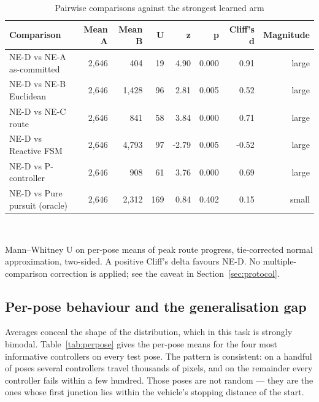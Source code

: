 \documentclass[conference]{IEEEtran}
\begin{document}
\begin{table}[!t]
\caption{Pairwise comparisons against the strongest learned arm}
\label{tab:tests}
\centering
\footnotesize
\begin{tabular}{lrrrrrrr}
\toprule
Comparison & Mean A & Mean B & U & z & p & Cliff's d & Magnitude \\
\midrule
NE-D vs NE-A as-committed & 2,646 & 404 & 19 & 4.90 & 0.000 & 0.91 & large \\
NE-D vs NE-B Euclidean & 2,646 & 1,428 & 96 & 2.81 & 0.005 & 0.52 & large \\
NE-D vs NE-C route & 2,646 & 841 & 58 & 3.84 & 0.000 & 0.71 & large \\
NE-D vs Reactive FSM & 2,646 & 4,793 & 97 & -2.79 & 0.005 & -0.52 & large \\
NE-D vs P-controller & 2,646 & 908 & 61 & 3.76 & 0.000 & 0.69 & large \\
NE-D vs Pure pursuit (oracle) & 2,646 & 2,312 & 169 & 0.84 & 0.402 & 0.15 & small \\
\bottomrule
\end{tabular}
\\[2pt]\parbox{\linewidth}{\scriptsize Mann–Whitney U on per-pose means of peak route progress, tie-corrected normal approximation, two-sided. A positive Cliff's delta favours NE-D. No multiple-comparison correction is applied; see the caveat in Section~\ref{sec:protocol}.}
\end{table}

\subsection{Per-pose behaviour and the generalisation gap}

Averages conceal the shape of the distribution, which in this task is strongly bimodal. Table~\ref{tab:perpose} gives the per-pose means for the four most informative controllers on every test pose. The pattern is consistent: on a handful of poses several controllers travel thousands of pixels, and on the remainder every controller fails within a few hundred. Those poses are not random — they are the ones whose first junction lies within the vehicle's stopping distance of the start.
\end{document}
